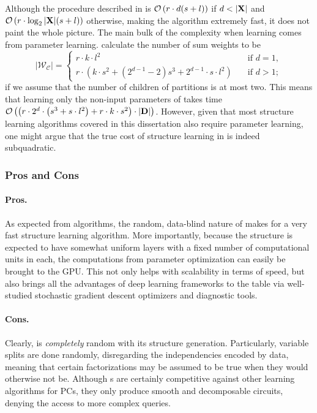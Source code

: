 Although the procedure described in  is $\mathcal{O}\left(r\cdot d(s+l)\right)$ if
$d<|\set{X}|$ and $\mathcal{O}\left(r\cdot\log_2 |\mathbf{X}|(s+l)\right)$ otherwise, making the algorithm
extremely fast, it does not paint the whole picture. The main bulk of the complexity when learning
 comes from parameter learning. \citet{peharz20a} calculate the number of sum
weights to be
\begin{equation*}
  |\mathcal{W}_\mathcal{C}|=\begin{cases}
    r\cdot k\cdot l^2 & \quad\text{if $d=1$,}\\
    r\cdot\left(k\cdot s^2+(2^{d-1}-2)s^3+2^{d-1}\cdot s\cdot l^2\right) & \quad\text{if $d>1$};
  \end{cases}
\end{equation*}
if we assume that the number of children of partitions is at most two. This means that learning
only the non-input parameters of  takes time $\mathcal{O}\left( \left(r\cdot 2^d
\cdot\left(s^3+s\cdot l^2\right)+r\cdot k\cdot s^2\right)\cdot|\mathbf{D}|\right)$. However, given
that most structure learning algorithms covered in this dissertation also require parameter
learning, one might argue that the true cost of structure learning in  is indeed
subquadratic.

\subsubsection{Pros and Cons}

\paragraph{Pros.} As expected from \randclass{} algorithms, the random, data-blind nature of
 makes for a very fast structure learning algorithm. More importantly, because
the structure is expected to have somewhat uniform layers with a fixed number of computational
units in each, the computations from parameter optimization can easily be brought to the GPU. This
not only helps with scalability in terms of speed, but also brings all the advantages of deep
learning frameworks to the table via well-studied stochastic gradient descent optimizers and
diagnostic tools.

\paragraph{Cons.} Clearly,  is \emph{completely} random with its structure
generation. Particularly, variable splits are done randomly, disregarding the independencies
encoded by data, meaning that certain factorizations may be assumed to be true when they would
otherwise not be. Although s are certainly competitive against other learning
algorithms for PCs, they only produce smooth and decomposable circuits, denying the access to more
complex queries.


